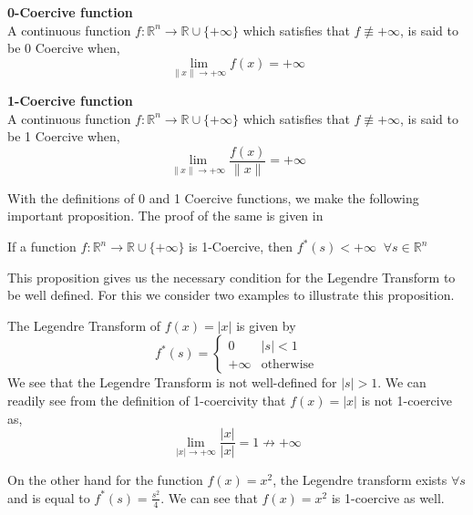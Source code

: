 \begin{definition}
  \textbf{0-Coercive function}\\
  A continuous function $f:\mathbb{R}^n \to \mathbb{R} \cup
  \{+\infty\}$ which satisfies that $f \not\equiv +\infty$, is said to
  be 0 Coercive when,
  \begin{equation}
    \lim_{\lVert x \rVert \to +\infty} f(x) = +\infty
  \end{equation}
\end{definition}

\begin{definition}
  \textbf{1-Coercive function}\\
  A continuous function $f:\mathbb{R}^n \to \mathbb{R} \cup
  \{+\infty\}$ which satisfies that $f \not\equiv +\infty$, is said to
  be 1 Coercive when,
  \begin{equation}
    \lim_{\lVert x \rVert \to +\infty} \frac{f(x)}{\lVert x \rVert} = +\infty
  \end{equation}
\end{definition}

\noindent
With the definitions of 0 and 1 Coercive functions, we make the
following important proposition. The proof of the same is given in \cite{bap}
\begin{proposition}
  If a function $f:\mathbb{R}^n \to \mathbb{R} \cup \{+\infty\}$ is
  1-Coercive, then $f^*(s) < +\infty \;\; \forall s\in\mathbb{R}^n$
\end{proposition}
This proposition gives us the necessary condition for the Legendre
Transform to be well defined. For this we consider two examples to
illustrate this proposition.
\begin{example}
  The Legendre Transform of $f(x) = \lvert x \rvert$ is given by
\begin{equation}
  f^*(s) = \left\{
    \begin{array}{ll}
      0 & \lvert s \rvert < 1\\
          +\infty & \text{otherwise}
      \end{array}
\right.
\end{equation}
We see that the Legendre Transform is not well-defined for $\lvert s
\rvert > 1$. We can readily see from the definition of 1-coercivity
that $f(x)=\lvert x \rvert$ is not 1-coercive as,
\begin{equation}
\lim_{\lvert x \rvert \to + \infty} \frac{\lvert x \rvert}{\lvert x
  \rvert} = 1 \not\to +\infty
\end{equation}

\noindent
On the other hand for the function $f(x) = x^2$, the Legendre
transform exists $\forall s$ and is equal to $f^*(s) = \frac{s^2}{4}$. We can
see that $f(x) = x^2$ is 1-coercive as well.
\end{example}

